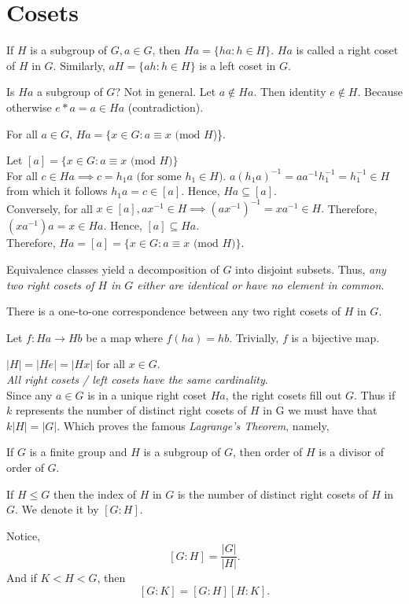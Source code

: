 \section{Cosets}
\begin{definition}[Cosets]
    If $H$ is a subgroup of $G, a \in G$, then $Ha = \{ha : h \in H\}$. $Ha$ is called a right coset of $H$ in $G$. Similarly, $aH = \{ah: h\in H\}$ is a left coset in $G$.
\end{definition}
Is $Ha$ a subgroup of $G$? Not in general. Let $a \not\in Ha$. Then identity $e \not \in H$. Because otherwise $e * a= a \in Ha$ (contradiction).\\
\begin{lemma}
    For all $a \in G$, $Ha = \{x \in G: a \equiv x \text{ (mod } H$)\}.
\end{lemma}
\begin{lemmaproof}
    Let $[a] = \{x \in G: a \equiv x \text{ (mod } H)\}$\\
    For all $c \in Ha \implies c = h_1a \text{ (for some $h_1 \in H$)}$. $a(h_1a)^{-1} = a a^{-1}h_1^{-1}  = h_1^{-1} \in H$ from which it follows $h_1a = c \in [a]$. Hence, $Ha \subseteq [a]$.\\
    Conversely, for all $x \in [a], ax^{-1} \in H \implies (ax^{-1})^{-1} = xa^{-1} \in H.$ Therefore, $(xa^{-1}) a = x \in Ha$. Hence, $[a] \subseteq Ha$.\\
    Therefore, $Ha = [a] = \{x \in G: a \equiv x \text{ (mod } H)\}$.
\end{lemmaproof}
Equivalence classes yield a decomposition of $G$ into disjoint subsets. Thus, \textit{any two right cosets of $H$ in $G$ either are identical or have no element in common}.
\begin{lemma}
    There is a one-to-one correspondence between any two right cosets of $H$ in $G$.
\end{lemma}
\begin{lemmaproof}
    Let $f: Ha \rightarrow Hb$ be a map where $f(ha) = hb$. Trivially, $f$ is a bijective map.
\end{lemmaproof}
$|H| = |He| = |Hx|$ for all $x \in G$.\\
\textit{All right cosets / left cosets have the same cardinality}.\\
Since any $a \in G$ is in a unique right coset $Ha$, the right cosets fill out $G$. Thus if $k$ represents the number of distinct right cosets of $H$ in G we must have that $k |H| = |G|$. Which proves the famous \textit{Lagrange's Theorem}, namely,
\begin{theorem}
    If $G$ is a finite group and $H$ is a subgroup of $G$, then order of $H$ is a divisor of order of $G$.
\end{theorem}
\begin{definition}[Index of $H$ in $G$]
    If $H \le G$ then the index of $H$ in $G$ is the number of distinct right cosets of $H$ in $G$. We denote it by $[G:H]$.
\end{definition}
Notice,  $$[G:H] = \frac{|G|}{|H|}.$$
And if $K < H < G$, then $$[G : K] = [G: H] [H : K].$$
